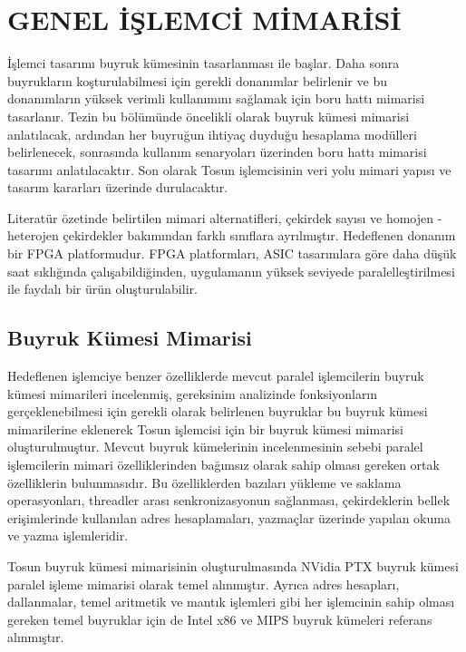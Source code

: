 \chapter{GENEL İŞLEMCİ MİMARİSİ}
İşlemci tasarımı buyruk kümesinin tasarlanması ile başlar. Daha sonra buyrukların koşturulabilmesi için gerekli donanımlar belirlenir ve bu donanımların yüksek verimli kullanımını sağlamak için boru hattı mimarisi tasarlanır. Tezin bu bölümünde öncelikli olarak buyruk kümesi mimarisi anlatılacak, ardından her buyruğun ihtiyaç duyduğu hesaplama modülleri belirlenecek, sonrasında kullanım senaryoları üzerinden boru hattı mimarisi tasarımı anlatılacaktır. Son olarak Tosun işlemcisinin veri yolu mimari yapısı ve tasarım kararları üzerinde durulacaktır.\par

Literatür özetinde belirtilen mimari alternatifleri, çekirdek sayısı ve homojen - heterojen çekirdekler bakımından farklı sınıflara ayrılmıştır. Hedeflenen donanım bir FPGA platformudur. FPGA platformları, ASIC tasarımlara göre daha düşük saat sıklığında çalışabildiğinden, uygulamanın yüksek seviyede paralelleştirilmesi ile faydalı bir ürün oluşturulabilir. \par

\section{Buyruk Kümesi Mimarisi}
Hedeflenen işlemciye benzer özelliklerde mevcut paralel işlemcilerin buyruk kümesi mimarileri incelenmiş, gereksinim analizinde fonksiyonların gerçeklenebilmesi için gerekli olarak belirlenen buyruklar bu buyruk kümesi mimarilerine eklenerek Tosun işlemcisi için bir buyruk kümesi mimarisi oluşturulmuştur. Mevcut buyruk kümelerinin incelenmesinin sebebi paralel işlemcilerin mimari özelliklerinden bağımsız olarak sahip olması gereken ortak özelliklerin bulunmasıdır. Bu özelliklerden bazıları yükleme ve saklama operasyonları, threadler arası senkronizasyonun sağlanması, çekirdeklerin bellek erişimlerinde kullanılan adres hesaplamaları, yazmaçlar üzerinde yapılan okuma ve yazma işlemleridir. \par

Tosun buyruk kümesi mimarisinin oluşturulmasında NVidia PTX \cite{nvidiaPTXISA} buyruk kümesi paralel işleme mimarisi olarak temel alınmıştır. Ayrıca adres hesapları, dallanmalar, temel aritmetik ve mantık işlemleri gibi her işlemcinin sahip olması gereken temel buyruklar için de Intel x86 \cite{x86ISA} ve MIPS \cite{MIPSISA} buyruk kümeleri referans alınmıştır. \par

